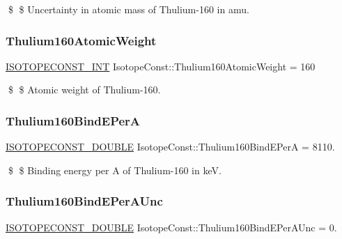 \$ \$ Uncertainty in atomic mass of Thulium-\/160 in amu. \mbox{\label{group___isotope_const-_thulium-_tm160_gaa5e558457217c7dc149c400ba16f7f66}} 
\subsubsection{\texorpdfstring{Thulium160\+Atomic\+Weight}{Thulium160AtomicWeight}}
{\footnotesize\ttfamily \mbox{\hyperlink{group___isotope_const-_macros_ga5f18360b3e99483a35c32d789e62621c}{I\+S\+O\+T\+O\+P\+E\+C\+O\+N\+S\+T\+\_\+\+I\+NT}} Isotope\+Const\+::\+Thulium160\+Atomic\+Weight = 160}

\$ \$ Atomic weight of Thulium-\/160. \mbox{\label{group___isotope_const-_thulium-_tm160_ga557f2202b9ff39a731f3e83376a6d555}} 
\subsubsection{\texorpdfstring{Thulium160\+Bind\+E\+PerA}{Thulium160BindEPerA}}
{\footnotesize\ttfamily \mbox{\hyperlink{group___isotope_const-_macros_ga8f45a7272ce02c0b4c65c44636ed719a}{I\+S\+O\+T\+O\+P\+E\+C\+O\+N\+S\+T\+\_\+\+D\+O\+U\+B\+LE}} Isotope\+Const\+::\+Thulium160\+Bind\+E\+PerA = 8110.}

\$ \$ Binding energy per A of Thulium-\/160 in keV. \mbox{\label{group___isotope_const-_thulium-_tm160_ga8f28b6d758d943f2aed58854289dd73f}} 
\subsubsection{\texorpdfstring{Thulium160\+Bind\+E\+Per\+A\+Unc}{Thulium160BindEPerAUnc}}
{\footnotesize\ttfamily \mbox{\hyperlink{group___isotope_const-_macros_ga8f45a7272ce02c0b4c65c44636ed719a}{I\+S\+O\+T\+O\+P\+E\+C\+O\+N\+S\+T\+\_\+\+D\+O\+U\+B\+LE}} Isotope\+Const\+::\+Thulium160\+Bind\+E\+Per\+A\+Unc = 0.}

